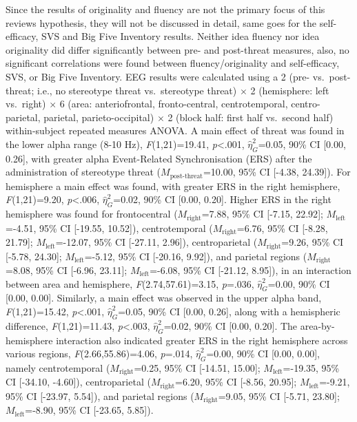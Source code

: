 \documentclass[
  stu]{apa7}
\begin{document}
Since the results of originality and fluency are not the primary focus of this reviews hypothesis, they will not be discussed in detail, same goes for the self-efficacy, SVS and Big Five Inventory results.
Neither idea fluency nor idea originality did differ significantly between pre- and post-threat measures, also, no significant correlations were found between fluency/originality and self-efficacy, SVS, or Big Five Inventory.
EEG results were calculated using a 2 (pre- vs.~post-threat; i.e., no stereotype threat vs.~stereotype threat) \(\times\) 2 (hemisphere: left vs.~right) \(\times\) 6 (area: anteriofrontal, fronto-central, centrotemporal, centro-parietal, parietal, parieto-occipital) \(\times\) 2 (block half: first half vs.~second half) within-subject repeated measures ANOVA.
A main effect of threat was found in the lower alpha range (8-10 Hz), \emph{F}(1,21)=19.41, \emph{p}\textless.001, \(\hat{\eta}^{2}_{G}\)=0.05, 90\% CI {[}0.00, 0.26{]}, with greater alpha Event-Related Synchronisation (ERS) after the administration of stereotype threat (\(M_{\text{post-threat}}\)=10.00, 95\% CI {[}-4.38, 24.39{]}).
For hemisphere a main effect was found, with greater ERS in the right hemisphere, \emph{F}(1,21)=9.20, \emph{p}\textless.006, \(\hat{\eta}^{2}_{G}\)=0.02, 90\% CI {[}0.00, 0.20{]}.
Higher ERS in the right hemisphere was found for frontocentral (\(M_{\text{right}}\)=7.88, 95\% CI {[}-7.15, 22.92{]}; \(M_{\text{left}}\)=-4.51, 95\% CI {[}-19.55, 10.52{]}), centrotemporal (\(M_{\text{right}}\)=6.76, 95\% CI {[}-8.28, 21.79{]}; \(M_{\text{left}}\)=-12.07, 95\% CI {[}-27.11, 2.96{]}), centroparietal (\(M_{\text{right}}\)=9.26, 95\% CI {[}-5.78, 24.30{]}; \(M_{\text{left}}\)=-5.12, 95\% CI {[}-20.16, 9.92{]}), and parietal regions (\(M_{\text{right}}\)=8.08, 95\% CI {[}-6.96, 23.11{]}; \(M_{\text{left}}\)=-6.08, 95\% CI {[}-21.12, 8.95{]}), in an interaction between area and hemisphere, \emph{F}(2.74,57.61)=3.15, \emph{p}=.036, \(\hat{\eta}^{2}_{G}\)=0.00, 90\% CI {[}0.00, 0.00{]}.
Similarly, a main effect was observed in the upper alpha band, \emph{F}(1,21)=15.42, \emph{p}\textless.001, \(\hat{\eta}^{2}_{G}\)=0.05, 90\% CI {[}0.00, 0.26{]}, along with a hemispheric difference, \emph{F}(1,21)=11.43, \emph{p}\textless.003, \(\hat{\eta}^{2}_{G}\)=0.02, 90\% CI {[}0.00, 0.20{]}.
The area-by-hemisphere interaction also indicated greater ERS in the right hemisphere across various regions, \emph{F}(2.66,55.86)=4.06, \emph{p}=.014, \(\hat{\eta}^{2}_{G}\)=0.00, 90\% CI {[}0.00, 0.00{]}, namely centrotemporal (\(M_{\text{right}}\)=0.25, 95\% CI {[}-14.51, 15.00{]}; \(M_{\text{left}}\)=-19.35, 95\% CI {[}-34.10, -4.60{]}), centroparietal (\(M_{\text{right}}\)=6.20, 95\% CI {[}-8.56, 20.95{]}; \(M_{\text{left}}\)=-9.21, 95\% CI {[}-23.97, 5.54{]}), and parietal regions (\(M_{\text{right}}\)=9.05, 95\% CI {[}-5.71, 23.80{]}; \(M_{\text{left}}\)=-8.90, 95\% CI {[}-23.65, 5.85{]}).
\end{document}
